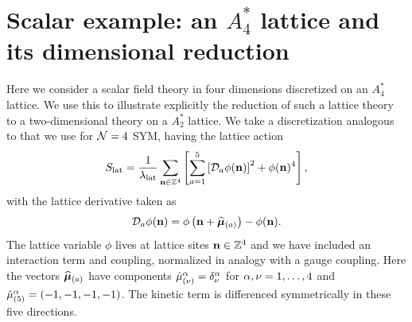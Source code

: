 \section{\label{app:scalar}Scalar example: an $A_4^*$ lattice and its dimensional reduction}
Here we consider a scalar field theory in four dimensions discretized on an $A_4^*$ lattice.
We use this to illustrate explicitly the reduction of such a lattice theory to a two-dimensional theory on a $A_2^*$ lattice.
We take a discretization analogous to that we use for $\mathcal N = 4$ SYM, having the lattice action
\begin{equation}
  \label{eq:latscalar}
  S_{\text{lat}} = \frac{1}{\lambda_{\text{lat}}} \sum_{\mathbf{n} \in \mathbb{Z}^4} \left[\sum_{a = 1}^5 \left[\mathcal D_a \phi(\mathbf{n})\right]^2 + \phi(\mathbf{n})^4 \right],
\end{equation}
with the lattice derivative taken as
\begin{equation}
  \mathcal D_a \phi(\mathbf{n}) = \phi\left(\mathbf{n} + \widehat{\boldsymbol{\mu}}_{(a)}\right) - \phi(\mathbf{n}).
\end{equation}
The lattice variable $\phi$ lives at lattice sites $\mathbf{n} \in \mathbb{Z}^4$ and we have included an interaction term and coupling, normalized in analogy with a gauge coupling.
Here the vectors $\widehat{\boldsymbol{\mu}}_{(a)}$ have components $\hat{\mu}_{(\nu)}^{\alpha} = \delta_{\nu}^{\alpha}$ for $\alpha, \nu = 1, \ldots, 4$ and $\hat{\mu}_{(5)}^{\alpha} = (-1, -1, -1, -1)$.
The kinetic term is differenced symmetrically in these five directions.

